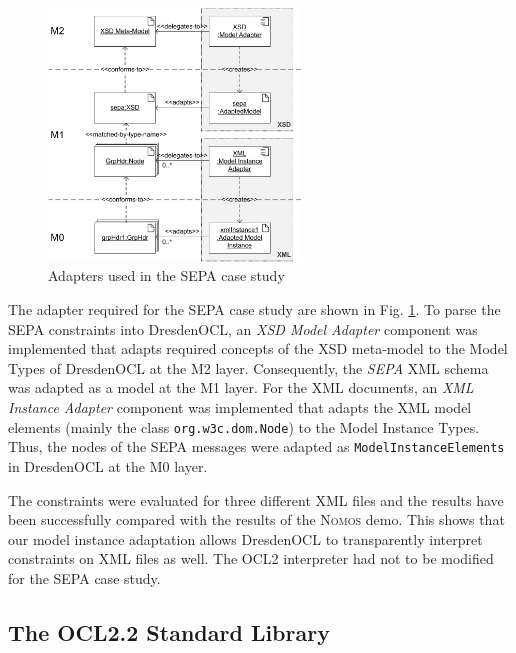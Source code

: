 \begin{figure}[!t]
	\centering
		\includegraphics[width=0.60\textwidth]{figures/casestudy02.pdf}
	\caption{Adapters used in the SEPA case study
	  }
	\label{fig:casestudy02}
\end{figure}

The adapter required for the SEPA case study are shown in Fig.
\ref{fig:casestudy02}. To parse the SEPA constraints
into DresdenOCL, an \textit{XSD Model Adapter} component was implemented that 
adapts required concepts of the XSD meta-model to the Model 
Types of DresdenOCL at the M2 layer. 
Consequently, the \textit{SEPA} XML schema was adapted as a model at the M1 layer.
For the XML
documents, an \textit{XML Instance Adapter} component was implemented that
adapts the XML model elements (mainly the class \texttt{org.w3c.dom.Node}) to the Model Instance Types. 
Thus, the nodes of the SEPA messages
were adapted as \texttt{ModelInstanceElements} in DresdenOCL at the M0 layer.

The constraints were evaluated for three different XML files 
and the results have been successfully compared with the results of the \textsc{Nomos} demo.
This shows that our model instance adaptation allows DresdenOCL to transparently interpret
constraints on XML files as well. The OCL2 interpreter had not to be modified for the SEPA case study.


\subsection{The OCL2.2 Standard Library}

